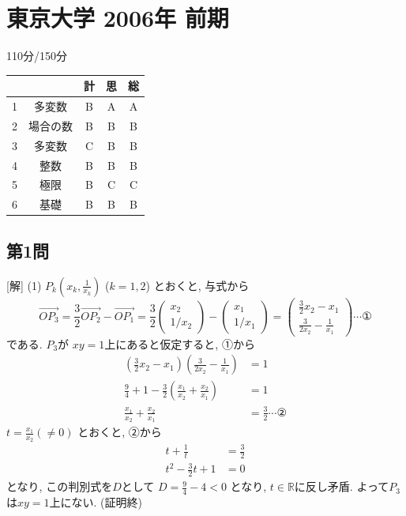 \documentclass[../main.tex]{subfiles}
\begin{document}
\section*{東京大学 2006年 前期}
\begin{flushright}
  110分/150分
\end{flushright}
\begin{center}
  \begin{tabular}{|c|c|c|c|c|}
    \hline
    & & 計 & 思 & 総 \\ \hline
    1 & 多変数 & B & A & A \\ \hline
    2 & 場合の数 & B & B & B \\ \hline
    3 & 多変数 & C & B & B \\ \hline
    4 & 整数 & B & B & B \\ \hline
    5 & 極限 & B & C & C \\ \hline
    6 & 基礎 & B & B & B \\ \hline
  \end{tabular}
\end{center}

\subsection*{第1問}
[解] (1) $P_k\left(x_k, \frac{1}{x_k}\right)$ ($k=1, 2$) とおくと, 与式から
\[ \overrightarrow{OP_3} = \frac{3}{2}\overrightarrow{OP_2} - \overrightarrow{OP_1} = \frac{3}{2}
  \begin{pmatrix} x_2 \\ 1/x_2
  \end{pmatrix} -
  \begin{pmatrix} x_1 \\ 1/x_1
  \end{pmatrix} =
  \begin{pmatrix} \frac{3}{2}x_2 - x_1 \\ \frac{3}{2x_2} - \frac{1}{x_1}
\end{pmatrix} \cdots \text{①} \]
である. $P_3$が $xy=1$上にあると仮定すると, ①から
\begin{align*}
  \left(\frac{3}{2}x_2 - x_1\right) \left(\frac{3}{2x_2} - \frac{1}{x_1}\right) &= 1 \\
  \frac{9}{4} + 1 - \frac{3}{2}\left(\frac{x_1}{x_2} + \frac{x_2}{x_1}\right) &= 1 \\
  \frac{x_1}{x_2} + \frac{x_2}{x_1} &= \frac{3}{2} \cdots \text{②}
\end{align*}
$t = \frac{x_1}{x_2} (\neq 0)$ とおくと, ②から
\begin{align*}
  t + \frac{1}{t} &= \frac{3}{2} \\
  t^2 - \frac{3}{2}t + 1 &= 0
\end{align*}
となり, この判別式を$D$として $D = \frac{9}{4} - 4 < 0$ となり, $t \in \mathbb{R}$に反し矛盾. よって$P_3$は$xy=1$上にない. (証明終)
\end{document}
